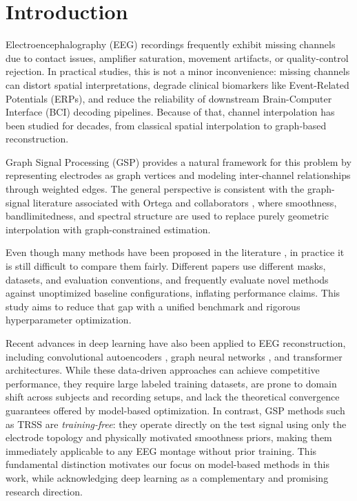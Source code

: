 \section{Introduction}

Electroencephalography (EEG) recordings frequently exhibit missing channels due to contact issues, amplifier saturation, movement artifacts, or quality-control rejection. In practical studies, this is not a minor inconvenience: missing channels can distort spatial interpretations, degrade clinical biomarkers like Event-Related Potentials (ERPs), and reduce the reliability of downstream Brain-Computer Interface (BCI) decoding pipelines. Because of that, channel interpolation has been studied for decades, from classical spatial interpolation to graph-based reconstruction.

Graph Signal Processing (GSP) provides a natural framework for this problem by representing electrodes as graph vertices and modeling inter-channel relationships through weighted edges. The general perspective is consistent with the graph-signal literature associated with Ortega and collaborators \cite{shuman2013,ortega2018}, where smoothness, bandlimitedness, and spectral structure are used to replace purely geometric interpolation with graph-constrained estimation.

Even though many methods have been proposed in the literature \cite{narang2013,puy2018,zhang2024bgsrp}, in practice it is still difficult to compare them fairly. Different papers use different masks, datasets, and evaluation conventions, and frequently evaluate novel methods against unoptimized baseline configurations, inflating performance claims. This study aims to reduce that gap with a unified benchmark and rigorous hyperparameter optimization.

Recent advances in deep learning have also been applied to EEG reconstruction, including convolutional autoencoders \cite{banville2021uncovering}, graph neural networks \cite{defferrard2016}, and transformer architectures. While these data-driven approaches can achieve competitive performance, they require large labeled training datasets, are prone to domain shift across subjects and recording setups, and lack the theoretical convergence guarantees offered by model-based optimization. In contrast, GSP methods such as TRSS are \emph{training-free}: they operate directly on the test signal using only the electrode topology and physically motivated smoothness priors, making them immediately applicable to any EEG montage without prior training. This fundamental distinction motivates our focus on model-based methods in this work, while acknowledging deep learning as a complementary and promising research direction.

